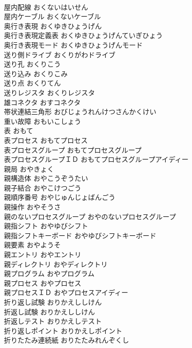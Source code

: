 \documentclass[8pt]{extreport}
\begin{document}
\begin{CJK}{UTF8}{min}
\\	屋内配線	おくないはいせん	
\\	屋内ケーブル	おくないケーブル	
\\	奥行き表現	おくゆきひょうげん	
\\	奥行き表現定義表	おくゆきひょうげんていぎひょう	
\\	奥行き表現モード	おくゆきひょうげんモード	
\\	送り側ドライブ	おくりがわドライブ	
\\	送り孔	おくりこう	
\\	送り込み	おくりこみ	
\\	送り点	おくりてん	
\\	送りレジスタ	おくりレジスタ	
\\	雄コネクタ	おすコネクタ	
\\	帯状連結三角形	おびじょうれんけつさんかくけい	
\\	重い故障	おもいこしょう	
\\	表	おもて	
\\	表プロセス	おもてプロセス	
\\	表プロセスグループ	おもてプロセスグループ	
\\	表プロセスグループＩＤ	おもてプロセスグループアイディー	
\\	親局	おやきょく	
\\	親構造体	おやこうぞうたい	
\\	親子結合	おやこけつごう	
\\	親順序番号	おやじゅんじょばんごう	
\\	親操作	おやそうさ	
\\	親のないプロセスグループ	おやのないプロセスグループ	
\\	親指シフト	おやゆびシフト	
\\	親指シフトキーボード	おやゆびシフトキーボード	
\\	親要素	おやようそ	
\\	親エントリ	おやエントリ	
\\	親ディレクトリ	おやディレクトリ	
\\	親プログラム	おやプログラム	
\\	親プロセス	おやプロセス	
\\	親プロセスＩＤ	おやプロセスアイディー	
\\	折り返し試験	おりかえししけん	
\\	折返し試験	おりかえししけん	
\\	折返しテスト	おりかえしテスト	
\\	折り返しポイント	おりかえしポイント	
\\	折りたたみ連続紙	おりたたみれんぞくし	

\end{CJK}
\end{document}
